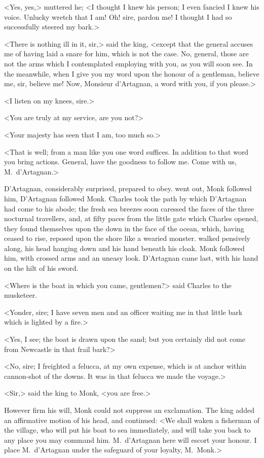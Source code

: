 <Yes, yes,> muttered he; <I thought I knew his person; I even fancied I knew his voice. Unlucky wretch that I am! Oh! sire, pardon me! I thought I had so successfully steered my bark.>

<There is nothing ill in it, sir,> said the king, <except that the general accuses me of having laid a snare for him, which is not the case. No, general, those are not the arms which I contemplated employing with you, as you will soon see. In the meanwhile, when I give you my word upon the honour of a gentleman, believe me, sir, believe me! Now, Monsieur d'Artagnan, a word with you, if you please.>

<I listen on my knees, sire.>

<You are truly at my service, are you not?>

<Your majesty has seen that I am, too much so.>

<That is well; from a man like you one word suffices. In addition to that word you bring actions. General, have the goodness to follow me. Come with us, M.~d'Artagnan.>

D'Artagnan, considerably surprised, prepared to obey.  went out, Monk followed him, D'Artagnan followed Monk. Charles took the path by which D'Artagnan had come to his abode; the fresh sea breezes soon caressed the faces of the three nocturnal travellers, and, at fifty paces from the little gate which Charles opened, they found themselves upon the down in the face of the ocean, which, having ceased to rise, reposed upon the shore like a wearied monster.  walked pensively along, his head hanging down and his hand beneath his cloak. Monk followed him, with crossed arms and an uneasy look. D'Artagnan came last, with his hand on the hilt of his sword.

<Where is the boat in which you came, gentlemen?> said Charles to the musketeer.

<Yonder, sire; I have seven men and an officer waiting me in that little bark which is lighted by a fire.>

<Yes, I see; the boat is drawn upon the sand; but you certainly did not come from Newcastle in that frail bark?>

<No, sire; I freighted a felucca, at my own expense, which is at anchor within cannon-shot of the downs. It was in that felucca we made the voyage.>

<Sir,> said the king to Monk, <you are free.>

However firm his will, Monk could not suppress an exclamation. The king added an affirmative motion of his head, and continued: <We shall waken a fisherman of the village, who will put his boat to sea immediately, and will take you back to any place you may command him. M.~d'Artagnan here will escort your honour. I place M.~d'Artagnan under the safeguard of your loyalty, M.~Monk.>


